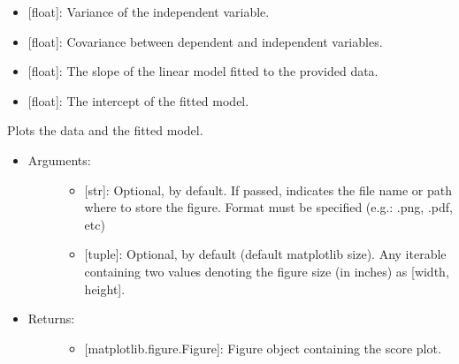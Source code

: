 \documentclass[letterpaper,10pt,english]{sphinxmanual}
\begin{document}
\begin{fulllineitems}
\begin{itemize}
\begin{description}
\begin{itemize}
\item {} 
 {[}float{]}: Variance of the independent variable.

\item {} 
 {[}float{]}: Covariance between dependent and independent
variables.

\item {} 
 {[}float{]}: The slope of the linear model fitted to the
provided data.

\item {} 
 {[}float{]}: The intercept of the fitted model.

\end{itemize}

\end{description}

\end{itemize}

\begin{fulllineitems}
\label{\detokenize{models:data_tools.models.Linear.plot}}
Plots the data and the fitted model.
\begin{itemize}
\item {} \begin{description}
\item[{Arguments:}] \leavevmode\begin{itemize}
\item {} 
 {[}str{]}: Optional,  by default. If
passed, indicates the file name or path where to store the
figure. Format must be specified (e.g.: .png, .pdf, etc)

\item {} 
 {[}tuple{]}: Optional,  by default (default
matplotlib size). Any iterable containing two values
denoting the figure size (in inches) as {[}width, height{]}.

\end{itemize}

\end{description}

\item {} \begin{description}
\item[{Returns:}] \leavevmode\begin{itemize}
\item {} 
{[}matplotlib.figure.Figure{]}: Figure object containing the
score plot.


\end{itemize}
\end{description}
\end{itemize}
\end{fulllineitems}
\end{fulllineitems}
\end{document}
